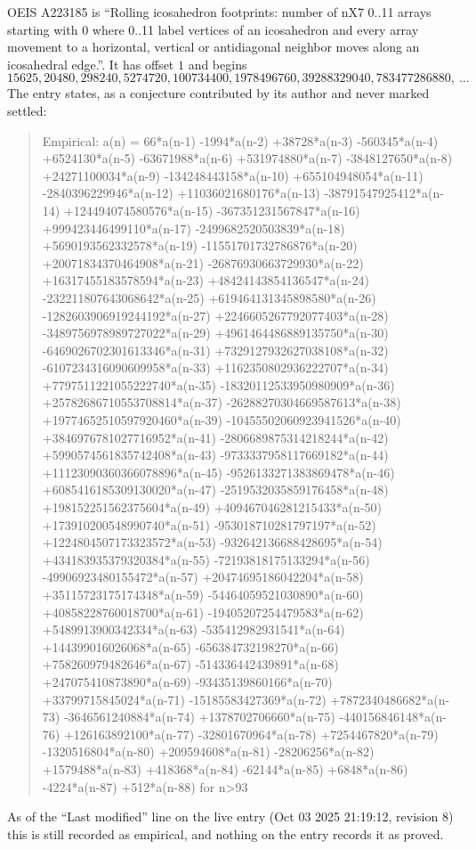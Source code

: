 \documentclass[11pt,a4paper]{article}
\theoremstyle{plain}
\theoremstyle{definition}
\begin{document}
OEIS A223185 is ``Rolling icosahedron footprints: number of nX7 0..11 arrays starting with 0 where 0..11 label vertices of an icosahedron and every array movement to a horizontal, vertical or antidiagonal neighbor moves along an icosahedral edge.''. It has offset $1$ and begins
\[
15625, 20480, 298240, 5274720, 100734400, 1978496760, 39288329040, 783477286880,\ \dots
\]
The entry states, as a conjecture contributed by its author and never marked settled:
\begin{quote}
Empirical: a(n) = 66*a(n-1) -1994*a(n-2) +38728*a(n-3) -560345*a(n-4) +6524130*a(n-5) -63671988*a(n-6) +531974880*a(n-7) -3848127650*a(n-8) +24271100034*a(n-9) -134248443158*a(n-10) +655104948054*a(n-11) -2840396229946*a(n-12) +11036021680176*a(n-13) -38791547925412*a(n-14) +124494074580576*a(n-15) -367351231567847*a(n-16) +999423446499110*a(n-17) -2499682520503839*a(n-18) +5690193562332578*a(n-19) -11551701732786876*a(n-20) +20071834370464908*a(n-21) -26876930663729930*a(n-22) +16317455183578594*a(n-23) +48424143854136547*a(n-24) -232211807643068642*a(n-25) +619464131345898580*a(n-26) -1282603906919244192*a(n-27) +2246605267792077403*a(n-28) -3489756978989727022*a(n-29) +4961464486889135750*a(n-30) -6469026702301613346*a(n-31) +7329127932627038108*a(n-32) -6107234316090609958*a(n-33) +1162350802936222707*a(n-34) +7797511221055222740*a(n-35) -18320112533950980909*a(n-36) +25782686710553708814*a(n-37) -26288270304669587613*a(n-38) +19774652510597920460*a(n-39) -10455502060923941526*a(n-40) +3846976781027716952*a(n-41) -2806689875314218244*a(n-42) +5990574561835742408*a(n-43) -9733337958117669182*a(n-44) +11123090360366078896*a(n-45) -9526133271383869478*a(n-46) +6085416185309130020*a(n-47) -2519532035859176458*a(n-48) +198152251562375604*a(n-49) +409467046281215433*a(n-50) +173910200548990740*a(n-51) -953018710281797197*a(n-52) +1224804507173323572*a(n-53) -932642136688428695*a(n-54) +434183935379320384*a(n-55) -72193818175133294*a(n-56) -49906923480155472*a(n-57) +20474695186042204*a(n-58) +35115723175174348*a(n-59) -54464059521030890*a(n-60) +40858228760018700*a(n-61) -19405207254479583*a(n-62) +5489913900342334*a(n-63) -535412982931541*a(n-64) +144399016026068*a(n-65) -656384732198270*a(n-66) +758260979482646*a(n-67) -514336442439891*a(n-68) +247075410873890*a(n-69) -93435139860166*a(n-70) +33799715845024*a(n-71) -15185583427369*a(n-72) +7872340486682*a(n-73) -3646561240884*a(n-74) +1378702706660*a(n-75) -440156846148*a(n-76) +126163892100*a(n-77) -32801670964*a(n-78) +7254467820*a(n-79) -1320516804*a(n-80) +209594608*a(n-81) -28206256*a(n-82) +1579488*a(n-83) +418368*a(n-84) -62144*a(n-85) +6848*a(n-86) -4224*a(n-87) +512*a(n-88) for n>93
\end{quote}
As of the ``Last modified'' line on the live entry (Oct 03 2025 21:19:12, revision 8) this is still
recorded as empirical, and nothing on the entry records it as proved.
\end{document}
